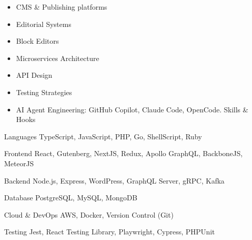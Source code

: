 


\begin{minipage}[t]{0.4\textwidth}

  \begin{itemize}
    \item CMS \& Publishing platforms
    \item Editorial Systems
    \item Block Editors
    \item Microservices Architecture
    \item API Design
    \item Testing Strategies
    \item {AI Agent Engineering: GitHub Copilot, Claude Code, OpenCode. Skills \& Hooks}
  \end{itemize}
\end{minipage}
\hfill
\begin{minipage}[t]{0.6\textwidth}

  \begin{cvskills}
    \cvskill
      {Languages}
      {TypeScript, JavaScript, PHP, Go, ShellScript, Ruby}

    \cvskill
      {Frontend}
      {React, Gutenberg, NextJS, Redux, Apollo GraphQL, BackboneJS, MeteorJS}

    \cvskill
      {Backend}
      {Node.js, Express, WordPress, GraphQL Server, gRPC, Kafka}

    \cvskill
      {Database}
      {PostgreSQL, MySQL, MongoDB}

    \cvskill
      {Cloud \& DevOps}
      {AWS, Docker, Version Control (Git)}

    \cvskill
      {Testing}
      {Jest, React Testing Library, Playwright, Cypress, PHPUnit}
  \end{cvskills}
\end{minipage}

\smallskip
